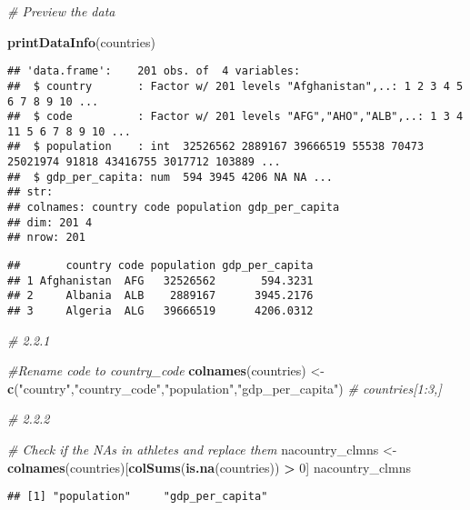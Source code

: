 \documentclass[]{article}
\newenvironment{Shaded}{\begin{snugshade}}{\end{snugshade}}
\newcommand{\CommentTok}[1]{\textcolor[rgb]{0.56,0.35,0.01}{\textit{#1}}}
\newcommand{\DecValTok}[1]{\textcolor[rgb]{0.00,0.00,0.81}{#1}}
\newcommand{\KeywordTok}[1]{\textcolor[rgb]{0.13,0.29,0.53}{\textbf{#1}}}
\newcommand{\NormalTok}[1]{#1}
\newcommand{\OperatorTok}[1]{\textcolor[rgb]{0.81,0.36,0.00}{\textbf{#1}}}
\newcommand{\StringTok}[1]{\textcolor[rgb]{0.31,0.60,0.02}{#1}}
\begin{document}
\begin{Shaded}
\begin{Highlighting}[]
\CommentTok{#   Preview the data}
    
    
    \KeywordTok{printDataInfo}\NormalTok{(countries)}
\end{Highlighting}
\end{Shaded}

\begin{verbatim}
## 'data.frame':    201 obs. of  4 variables:
##  $ country       : Factor w/ 201 levels "Afghanistan",..: 1 2 3 4 5 6 7 8 9 10 ...
##  $ code          : Factor w/ 201 levels "AFG","AHO","ALB",..: 1 3 4 11 5 6 7 8 9 10 ...
##  $ population    : int  32526562 2889167 39666519 55538 70473 25021974 91818 43416755 3017712 103889 ...
##  $ gdp_per_capita: num  594 3945 4206 NA NA ...
## str: 
## colnames: country code population gdp_per_capita 
## dim: 201 4 
## nrow: 201
\end{verbatim}

\begin{verbatim}
##       country code population gdp_per_capita
## 1 Afghanistan  AFG   32526562       594.3231
## 2     Albania  ALB    2889167      3945.2176
## 3     Algeria  ALG   39666519      4206.0312
\end{verbatim}

\begin{Shaded}
\begin{Highlighting}[]
\CommentTok{# 2.2.1  }
  
    \CommentTok{#Rename code to country_code }
    \KeywordTok{colnames}\NormalTok{(countries) <-}\StringTok{ }\KeywordTok{c}\NormalTok{(}\StringTok{"country"}\NormalTok{,}\StringTok{"country_code"}\NormalTok{,}\StringTok{"population"}\NormalTok{,}\StringTok{"gdp_per_capita"}\NormalTok{)}
    \CommentTok{# countries[1:3,]}
    
    
\CommentTok{# 2.2.2}
   
    \CommentTok{#  Check if the NAs in athletes and replace them  }
\NormalTok{    nacountry_clmns <-}\StringTok{ }\KeywordTok{colnames}\NormalTok{(countries)[}\KeywordTok{colSums}\NormalTok{(}\KeywordTok{is.na}\NormalTok{(countries)) }\OperatorTok{>}\StringTok{ }\DecValTok{0}\NormalTok{]}
\NormalTok{    nacountry_clmns}
\end{Highlighting}
\end{Shaded}

\begin{verbatim}
## [1] "population"     "gdp_per_capita"
\end{verbatim}
\end{document}
